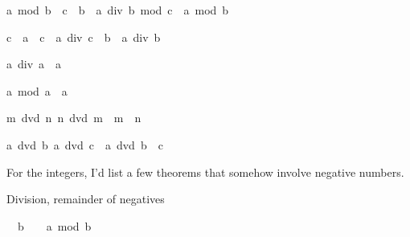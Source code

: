\begin{isabellebody}
\begin{isamarkuptext}
\begin{isabelle}%
a\ mod\ {\isacharparenleft}b\ {\isacharasterisk}\ c{\isacharparenright}\ {\isacharequal}\ b\ {\isacharasterisk}\ {\isacharparenleft}a\ div\ b\ mod\ c{\isacharparenright}\ {\isacharplus}\ a\ mod\ b%
\end{isabelle}

\begin{isabelle}%
c\ {\isasymnoteq}\ {\isacharparenleft}{}{\isasymColon}{\isacharprime}a{\isacharparenright}\ {\isasymLongrightarrow}\ c\ {\isacharasterisk}\ a\ div\ {\isacharparenleft}c\ {\isacharasterisk}\ b{\isacharparenright}\ {\isacharequal}\ a\ div\ b%
\end{isabelle}

\begin{isabelle}%
a\ div\ {\isacharparenleft}{}{\isasymColon}{\isacharprime}a{\isacharparenright}\ {\isacharequal}\ {\isacharparenleft}{}{\isasymColon}{\isacharprime}a{\isacharparenright}%
\end{isabelle}

\begin{isabelle}%
a\ mod\ {\isacharparenleft}{}{\isasymColon}{\isacharprime}a{\isacharparenright}\ {\isacharequal}\ a%
\end{isabelle}

\begin{isabelle}%
{\isasymlbrakk}m\ dvd\ n{\isacharsemicolon}\ n\ dvd\ m{\isasymrbrakk}\ {\isasymLongrightarrow}\ m\ {\isacharequal}\ n%
\end{isabelle}

\begin{isabelle}%
{\isasymlbrakk}a\ dvd\ b{\isacharsemicolon}\ a\ dvd\ c{\isasymrbrakk}\ {\isasymLongrightarrow}\ a\ dvd\ b\ {\isacharplus}\ c%
\end{isabelle}

For the integers, I'd list a few theorems that somehow involve negative 
numbers.%
\end{isamarkuptext}%
\isamarkuptrue%
%
\begin{isamarkuptext}%
Division, remainder of negatives


\begin{isabelle}%
{}\ {\isacharless}\ b\ {\isasymLongrightarrow}\ {}\ {\isasymle}\ a\ mod\ b%
\end{isabelle}


\end{isamarkuptext}
\end{isabellebody}
